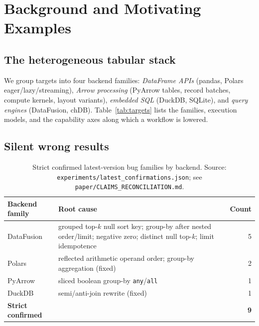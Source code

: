 \section{Background and Motivating Examples}
\label{sec:background}

\subsection{The heterogeneous tabular stack}

We group targets into four backend families:
\emph{DataFrame APIs} (pandas, Polars eager/lazy/streaming),
\emph{Arrow processing} (PyArrow tables, record batches, compute kernels, layout variants),
\emph{embedded SQL} (DuckDB, SQLite), and
\emph{query engines} (DataFusion, chDB).
Table~\ref{tab:targets} lists the families, execution models, and the capability axes along
which a workflow is lowered. 

\subsection{Silent wrong results}


\begin{table}[t]
\caption{Strict confirmed latest-version bug families by backend.
Source: \texttt{experiments/latest\_confirmations.json}; see
\texttt{paper/CLAIMS\_RECONCILIATION.md}.}
\label{tab:bugs}
\small
\begin{tabular}{@{}llr@{}}
\toprule
Backend family & Root cause & Count \\
\midrule
DataFusion & grouped top-$k$ null sort key; group-by after nested order/limit; negative zero;
distinct null top-$k$; limit idempotence & 5 \\
Polars & reflected arithmetic operand order; group-by aggregation (fixed) & 2 \\
PyArrow & sliced boolean group-by \texttt{any}/\texttt{all} & 1 \\
DuckDB & semi/anti-join rewrite (fixed) & 1 \\
\midrule
\textbf{Strict confirmed} & & \textbf{9} \\
\bottomrule
\end{tabular}
\end{table}

